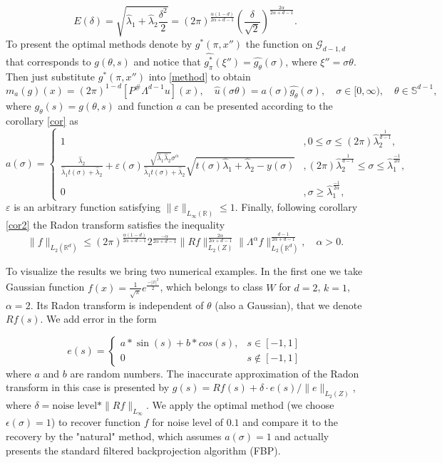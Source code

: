 \documentclass[12pt]{iopart}
\begin{document}
	$$
	E(\delta)=\sqrt{\widehat\lambda_1+\widehat\lambda_2\frac{\delta^2}{2}}=(2\pi)^{\frac{\alpha(1-d)}{2\alpha+d-1}}\left(\frac{\delta}{\sqrt{2}}\right)^{\frac{2\alpha}{2\alpha+d-1}}.
	$$
	To present the optimal methods denote by $g^*(\pi,x'')$ the function on $\mathcal G_{d-1,d}$ that corresponds to $g(\theta,s)$ and notice that $\widehat{g^*_\pi}(\xi'')=\widehat{g_\theta}(\sigma)$, where $\xi''=\sigma\theta$. Then just substitute $g^*(\pi,x'')$ into \eqref{method} to obtain
	$$m_a(g)(x) = (2\pi)^{1-d}[P^\#\Lambda^{d-1}u](x),\quad \widehat{u}(\sigma\theta)= a(\sigma)\widehat{g_\theta}(\sigma),\quad \sigma\in[0,\infty),\quad \theta\in\mathbb S^{d-1},
	$$
	where $g_{\theta}(s)=g(\theta,s)$ and function $a$ can be presented according to the corollary \ref{cor} as
	$$
	a(\sigma)=
	\begin{cases}
	1& ,0\leqslant\sigma\leqslant (2\pi)\widehat\lambda_2^\frac{1}{d-1},\\
	\frac{\widehat\lambda_2}{\widehat\lambda_1t(\sigma)+\widehat\lambda_2}+\varepsilon(\sigma)\frac{\sqrt{\widehat\lambda_1\widehat\lambda_2}\sigma^\alpha}{\widehat\lambda_1t(\sigma)+\widehat\lambda_2}\sqrt{t(\sigma)\widehat\lambda_1+\widehat\lambda_2-y(\sigma)}& ,(2\pi)\widehat\lambda_2^\frac{1}{d-1} \leqslant\sigma\leqslant\widehat\lambda_1^{\frac{-1}{2\alpha}},\\
	0 &,\sigma\geqslant\widehat\lambda_1^{\frac{-1}{2\alpha}},
	\end{cases}
	$$
	$\varepsilon$ is an arbitrary function satisfying $\|\varepsilon\|_{L_\infty(\mathbb R)}\leqslant 1$.
	Finally, following corollary \ref{cor2} the Radon transform satisfies the inequality
	$$
	\|f\|_{L_2(\mathbb R^d)}\leqslant
	(2\pi)^{\frac{\alpha(1-d)}{2\alpha+d-1}}2^{\frac{-\alpha}{2\alpha+d-1}}\|Rf\|_{L_2(Z)}^{\frac{2\alpha}{2\alpha+d-1}}\|\Lambda^\alpha f\|_{L_2(\mathbb
		R^d)}^\frac{d-1}{2\alpha+d-1},\quad \alpha>0.
	$$
	
	To visualize the results we bring two numerical examples. In the first one we take Gaussian function $f(x)=\frac{1}{\sqrt{\pi}}e^\frac{-|x|^2}{2}$, which belongs to class $W$ for $d=2$, $k=1$, $\alpha = 2$. Its Radon transform is independent of $\theta$ (also a Gaussian), that we denote $Rf(s)$. We add error in the form 
	
	$$e(s) = \begin{cases}
	a*\sin(s)+b*cos(s), & s\in[-1,1] \\
	0 & s\notin[-1,1]
	\end{cases}
	$$
	where $a$ and $b$ are random numbers. The inaccurate approximation of the Radon transform in this case is presented by $g(s)=Rf(s)+\delta \cdot e(s)/\|e\|_{L_2(Z)}$, where $\delta=\mbox{noise level}*\|Rf\|_{L_\infty}$. We apply the optimal method (we choose $\epsilon(\sigma) = 1$) to recover function $f$ for noise level of $0.1$ and compare it to the recovery by the "natural" method, which assumes $a(\sigma)=1$ and actually presents the standard filtered backprojection algorithm (FBP).
	
\end{document}
